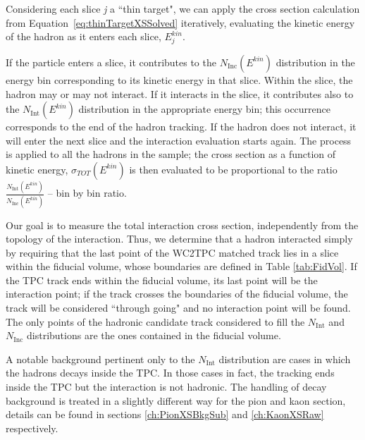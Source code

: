 \documentclass[aps,prl,twocolumn,showpacs,superscriptaddress,groupedaddress]{revtex4}  %
\begin{document}


Considering each slice {\emph{j}}  a ``thin target",  we can apply the cross section calculation from Equation~\ref{eq:thinTargetXSSolved} iteratively, evaluating the kinetic energy of the hadron as it enters each slice, $E_{j}^{kin}$.  





If the particle enters a slice, it contributes to the $N_{\text{Inc}}( E^{kin})$ distribution in the energy bin corresponding to its kinetic energy in that slice.  Within the slice, the hadron may or may not interact. If it interacts in the slice, it  contributes also to the $N_{\text{Int}}(E^{kin})$ distribution in the appropriate energy bin; this occurrence corresponds to the end of the hadron tracking. If the hadron does not interact, it will enter the next slice and the interaction evaluation starts again.
The process is applied to all the hadrons in the sample; the cross section as a function of kinetic energy, $\sigma_{TOT}( E^{kin})$ is then evaluated to be proportional to the ratio $\frac{N_{\text{Int}}( E^{kin})}{N_{\text{Inc}}( E^{kin})}$ -- bin by bin ratio. 


Our goal is to measure the total interaction cross section, independently  from the topology of the interaction. Thus, we determine that a hadron interacted simply by requiring that the last point of the WC2TPC matched track lies in a slice within the fiducial volume, whose boundaries are defined in Table \ref{tab:FidVol}. If the TPC track ends within the fiducial volume, its last point will be the interaction point; if the track crosses the boundaries of the fiducial volume, the track will be considered ``through going" and no interaction point will be found. The only points of the hadronic candidate track considered to fill the  $N_{\text{Int}}$ and  $N_{\text{Inc}}$ distributions are the ones contained in the fiducial volume. 
 
 A notable background pertinent only to the $N_{\text{Int}}$  distribution are cases in which the hadrons decays inside the TPC. In those cases in fact, the tracking ends inside the TPC but the interaction is not hadronic. The handling of decay background is treated in a slightly different way for the pion and kaon section, details can be found in sections \ref{ch:PionXSBkgSub} and \ref{ch:KaonXSRaw} respectively.
\end{document}
